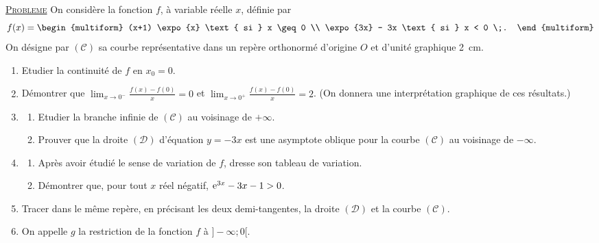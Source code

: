 \noindent \underline{\textsc{Probleme}} \newline
      On consid\`ere la fonction $f$, \`a variable r\'eelle $x$, d\'efinie par 
      \[
            f(x) = \begin{multiform}
                         (x+1) \expo{x}   \text{ si } x \geq 0 \\
                         \expo{3x} - 3x   \text{ si } x < 0 \;.
                   \end{multiform}
      \]
      On d\'esigne par $(\mathscr{C})$ sa courbe repr\'esentative dans un rep\`ere orthonorm\'e d'origine $O$
      et d'unit\'e graphique 2~cm.
      \begin{enumerate}
            \item Etudier la continuit\'e de $f$ en $x_0 = 0$.
            \item D\'emontrer que $\displaystyle{\lim_{x\rightarrow 0^-} \frac{f(x)-f(0)}{x} = 0}$
                  et $\displaystyle{\lim_{x\rightarrow0^+} \frac{f(x)-f(0)}{x} = 2}$.
                  (On donnera une interpr\'etation graphique de ces r\'esultats.)
            \item \begin{enumerate}
                        \item Etudier la branche infinie de $(\mathscr{C})$ au voisinage de $+\infty$.
                        \item Prouver que la droite $(\mathscr{D})$ d'\'equation $y = -3x$ est une 
                              asymptote oblique pour la courbe $(\mathscr{C})$ au voisinage de $-\infty$.
                  \end{enumerate}
            \item \begin{enumerate}
                        \item Apr\`es avoir \'etudi\'e le sense de variation de $f$, dresse son tableau de variation.
                        \item D\'emontrer que, pour tout $x$ r\'eel n\'egatif, $\mathrm{e}^{3x} - 3x - 1 > 0$.
                  \end{enumerate}
            \item Tracer dans le m\^eme rep\`ere, en pr\'ecisant les deux demi-tangentes, la droite $(\mathscr{D})$ 
                  et la courbe $(\mathscr{C})$.
            \item On appelle $g$ la restriction de la fonction $f$ \`a $]-\infty ; 0[$.

\end{enumerate}
